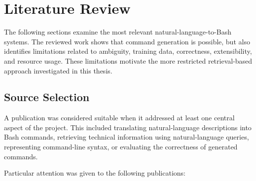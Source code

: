 \section{Literature Review}
The following sections examine the most relevant natural-language-to-Bash systems. The reviewed work shows that command generation is possible, but also identifies limitations related to ambiguity, training data, correctness, extensibility, and resource usage. These limitations motivate the more restricted retrieval-based approach investigated in this thesis.

\subsection{Source Selection}

A publication was considered suitable when it addressed at least one central aspect of the
project. This included translating natural-language descriptions into Bash commands, retrieving technical information using natural-language queries, representing command-line syntax, or evaluating the correctness of generated commands.

Particular attention was given to the following publications:

